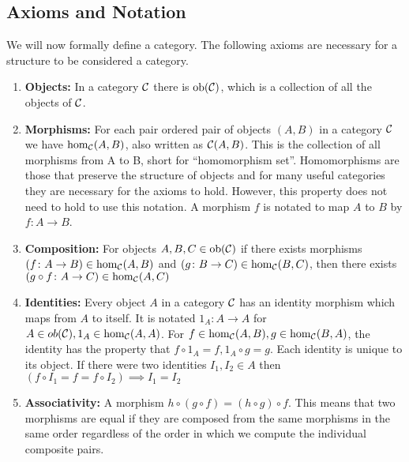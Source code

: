 \subsection{Axioms and Notation}

We will now formally define a category. The following axioms are necessary for a
structure to be considered a category.
\begin{enumerate}
        \item \textbf{Objects:} In a category $\mathcal{C}$ there is
        $\operatorname{ob}(\mathcal{C})$, which is a collection of all the objects of
        $\mathcal{C}$.

        \item \textbf{Morphisms:} For each pair ordered pair of objects $(A,B)$
        in a category $\mathcal{C}$ we have $\hom_\mathcal{C}(A,B)$, also written
        as $\mathcal{C}(A,B)$.  This is the collection of all morphisms from A to
        B, short for ``homomorphism set''. Homomorphisms are those that preserve
        the structure of objects and for many useful categories they are
        necessary for the axioms to hold. However, this property does not need
        to hold to use this notation. A morphism $f$ is notated to map $A$ to
        $B$ by $f\colon A\to B$.

        \item \textbf{Composition:} For objects $A,B,C\in \operatorname{ob}(\mathcal{C})$
        if there exists morphisms $(f\colon A\to B)\in \hom_\mathcal{C}(A,B)$ and
        $(g \colon B\to C)\in \hom_\mathcal{C}(B,C)$, then there exists $(g\circ
        f\colon A\to C)\in \hom_\mathcal{C}(A,C)$

        \item \textbf{Identities:} Every object $A$ in a category $\mathcal{C}$
        has an identity morphism which maps from $A$ to itself.  It is notated
        $1_A\colon A\to A$ for $A\in ob(\mathcal{C}), 1_A\in
        \hom_\mathcal{C}(A,A)$.  For $f\in \hom_\mathcal{C}(A,B), g\in
        \hom_\mathcal{C}(B,A)$, the identity has the property that $f\circ 1_A =
        f, 1_A\circ g = g$. Each identity is unique to its object. If there were
        two identities $I_1,I_2\in A$ then $(f\circ I_1 = f = f\circ I_2)
        \implies I_1=I_2$

        \item \textbf{Associativity:} A morphism $h\circ(g\circ f) = (h\circ
        g)\circ f$. This means that two morphisms are equal if they are composed
        from the same morphisms in the same order regardless of the order in
        which we compute the individual composite pairs.
\end{enumerate}
